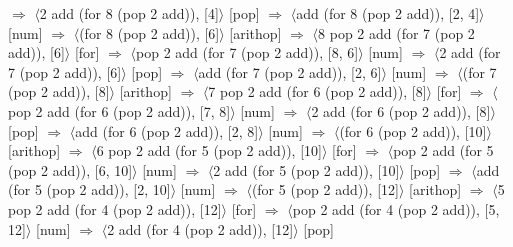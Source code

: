 \documentclass[12pt]{report}
\begin{document}
$\Rightarrow$ $\langle$2 add (for 8 (pop 2 add)), [4]$\rangle$ \hfill [pop] \newline
$\Rightarrow$ $\langle$add (for 8 (pop 2 add)), [2, 4]$\rangle$ \hfill [num] \newline
$\Rightarrow$ $\langle$(for 8 (pop 2 add)), [6]$\rangle$ \hfill [arithop] \newline
$\Rightarrow$ $\langle$8 pop 2 add (for 7 (pop 2 add)), [6]$\rangle$ \hfill [for] \newline
$\Rightarrow$ $\langle$pop 2 add (for 7 (pop 2 add)), [8, 6]$\rangle$ \hfill [num] \newline
$\Rightarrow$ $\langle$2 add (for 7 (pop 2 add)), [6]$\rangle$ \hfill [pop] \newline
$\Rightarrow$ $\langle$add (for 7 (pop 2 add)), [2, 6]$\rangle$ \hfill [num] \newline
$\Rightarrow$ $\langle$(for 7 (pop 2 add)), [8]$\rangle$ \hfill [arithop] \newline
$\Rightarrow$ $\langle$7 pop 2 add (for 6 (pop 2 add)), [8]$\rangle$ \hfill [for] \newline
$\Rightarrow$ $\langle$pop 2 add (for 6 (pop 2 add)), [7, 8]$\rangle$ \hfill [num] \newline
$\Rightarrow$ $\langle$2 add (for 6 (pop 2 add)), [8]$\rangle$ \hfill [pop] \newline
$\Rightarrow$ $\langle$add (for 6 (pop 2 add)), [2, 8]$\rangle$ \hfill [num] \newline
$\Rightarrow$ $\langle$(for 6 (pop 2 add)), [10]$\rangle$ \hfill [arithop] \newline
$\Rightarrow$ $\langle$6 pop 2 add (for 5 (pop 2 add)), [10]$\rangle$ \hfill [for] \newline
$\Rightarrow$ $\langle$pop 2 add (for 5 (pop 2 add)), [6, 10]$\rangle$ \hfill [num] \newline
$\Rightarrow$ $\langle$2 add (for 5 (pop 2 add)), [10]$\rangle$ \hfill [pop] \newline
$\Rightarrow$ $\langle$add (for 5 (pop 2 add)), [2, 10]$\rangle$ \hfill [num] \newline
$\Rightarrow$ $\langle$(for 5 (pop 2 add)), [12]$\rangle$ \hfill [arithop] \newline
$\Rightarrow$ $\langle$5 pop 2 add (for 4 (pop 2 add)), [12]$\rangle$ \hfill [for] \newline
$\Rightarrow$ $\langle$pop 2 add (for 4 (pop 2 add)), [5, 12]$\rangle$ \hfill [num] \newline
$\Rightarrow$ $\langle$2 add (for 4 (pop 2 add)), [12]$\rangle$ \hfill [pop] \newline
\end{document}
